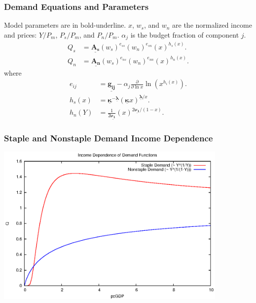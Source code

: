 \documentclass{beamer}
\begin{document}
\newcommand{\bmu}[1]{\underline{\boldsymbol{#1}}}

\begin{frame}
  \frametitle{Demand Equations and Parameters}
  Model parameters are in bold-underline.  $x$, $w_s$, and $w_n$ are
  the normalized income and prices: $Y/P_m$, $P_s/P_m$, and
  $P_n/P_m$.  $\alpha_j$ is the budget
  fraction of component $j$.
    \begin{align}
    Q_s &=
    \bmu{A_s}\left(w_s\right)^{e_{ss}}\left(w_n\right)^{e_{sn}}\left(x\right)^{h_s(x)}.\\
    Q_n &=
    \bmu{A_n}\left(w_s\right)^{e_{ns}}\left(w_n\right)^{e_{nn}}\left(x\right)^{h_n(x)}.
    \end{align}
    where
    \begin{align}
      e_{ij} &= \bmu{g_{ij}} - \alpha_j
      \frac{\partial}{\partial \ln x} \ln\left(x^{h_i(x)}\right).\\
      h_s(x) &= \bmu{\kappa}^{-\bmu{\lambda}}
      \left(\bmu{\kappa}x\right)^{\bmu{\lambda}/x}.\\
      h_n(Y) &= \frac{1}{2\bmu{\nu_1}}\left(x\right)^{2\bmu{\nu_1}/\left(1-x\right)}.
    \end{align}
\end{frame}

\begin{frame}
  \frametitle{Staple and Nonstaple Demand Income Dependence}
  \begin{center}
    \includegraphics[width=0.85\textwidth]{fig/yfuncs.eps}
  \end{center}
\end{frame}
\end{document}
